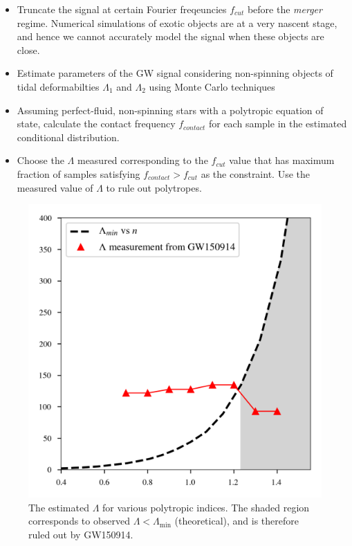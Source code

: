 \documentclass[a1,portrait]{a1poster}
\begin{document}
\begin{textblock}{7}
\begin{itemize}
	\item Truncate the signal at certain Fourier freqeuncies $ f_{cut} $ before the \textit{merger} regime. Numerical simulations of exotic objects are at a very nascent stage, and hence we cannot accurately model the signal when these objects are close. 
	\item Estimate parameters of the GW signal considering non-spinning objects of tidal deformabilties $ \Lambda_1 $ and $ \Lambda_2 $ using Monte Carlo techniques
	\item Assuming perfect-fluid, non-spinning stars with a polytropic equation of state, calculate the contact frequency $f_{contact}$ for each sample in the estimated conditional distribution.
	\item Choose the $ \Lambda $ measured corresponding to the $ f_{cut} $ value that has maximum fraction of samples satisfying $ f_{contact} > f_{cut} $ as the constraint. Use the measured value of $ \Lambda $ to rule out polytropes.
\end{itemize}

\begin{figure}[t]
	\centering
	\includegraphics[scale=1.5]{GW150914_68p_constraints.png}
	\caption{\small{The estimated $\Lambda$ for various polytropic indices. The shaded region corresponds to observed $\Lambda < \Lambda_\mathrm{min}$ (theoretical), and is therefore ruled out by GW150914.}}
\end{figure}

\end{textblock}
\end{document}
